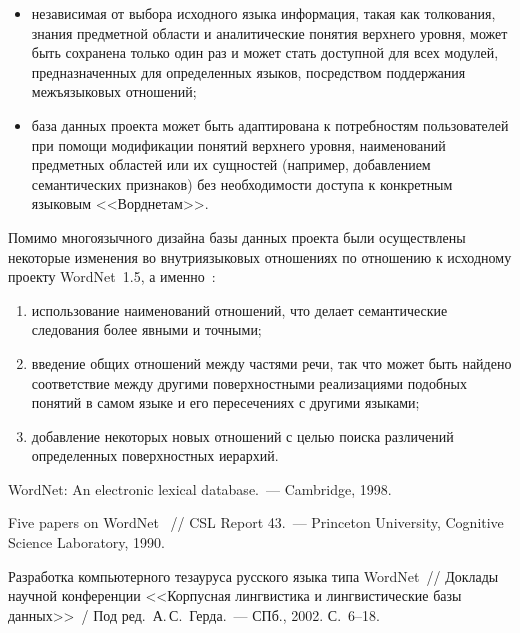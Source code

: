 \begin{multicols}{2}
\begin{itemize}
\item независимая от выбора исходного языка информация, такая как 
толкования, знания предметной области и аналитические понятия 
верхнего уровня, может быть сохранена только один раз и может стать 
доступной для всех модулей, предназначенных для определенных 
языков, посредством поддержания межъязыковых отношений; 
\item база данных проекта может быть адаптирована к потребностям 
пользователей при помощи модификации понятий верхнего уровня, 
наименований предметных областей или их сущностей (например, 
добавлением семантических признаков) без необходимости доступа к 
конкретным языковым <<Ворднетам>>. 
\end{itemize}

     Помимо многоязычного дизайна базы данных проекта были 
осуществлены некоторые изменения во внутриязыковых отношениях по 
отношению к исходному проекту WordNet~1.5, а именно~\cite{4koz, 7koz}:
     \begin{enumerate}[(1)]
     \item
использование наименований отношений, что делает семантические 
следования более явными и точными; 
\item введение общих отношений между частями речи, так что может 
быть найдено соответствие между другими поверхностными 
реализациями подобных понятий в самом языке и его пересечениях с 
другими языками; 
\item добавление некоторых новых отношений с \mbox{целью} поиска 
различений определенных поверхностных иерархий. 
\end{enumerate}

{\small\frenchspacing
{%
\begin{thebibliography}{99}

WordNet: An electronic lexical database.~--- Cambridge, 1998. 

Five papers on WordNet ~// CSL Report 43.~--- Princeton University, Cognitive Science Laboratory, 1990. 

Разработка компьютерного тезауруса русского языка типа WordNet~// Доклады 
научной конференции <<Корпусная лингвистика и лингвистические базы 
данных>>~/ Под ред.\ А.\,С.~Герда.~--- СПб., 2002. С.~6--18.


\end{thebibliography}}}
\end{multicols}
